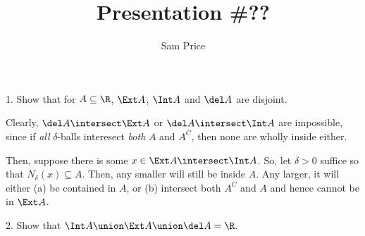 \documentclass{article}
\author{Sam Price}
\date{}
\title{Presentation \#??}
\begin{document}
\maketitle

1. Show that for $A \subseteq \R$, $\Ext A$, $\Int A$ and $\del A$ are disjoint.

Clearly, $\del A \intersect \Ext A$ or $\del A \intersect \Int A$ are impossible, since if \emph{all} $\delta$-balls
interesect \emph{both} $A$ and $A^{C}$, then none are wholly inside either.

Then, suppose there is some $x \in \Ext A \intersect \Int A$. So, let $\delta > 0$ suffice so that $N_{\delta}(x) \subseteq A$.
Then, any smaller will still be inside $A$. Any larger, it will either (a) be contained in $A$, or (b) intersect both $A^{C}$ and $A$
and hence cannot be in $\Ext A$.

2. Show that $\Int A \union \Ext A \union \del A = \R$.
\end{document}
